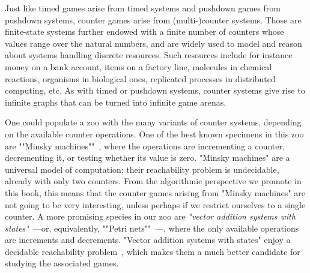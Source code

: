 
%
%

Just like timed games arise from timed systems and pushdown games
from pushdown systems, counter games arise from (multi-)counter
systems.  Those are finite-state systems further endowed with a
finite number of counters whose values range over the natural numbers,
and are widely used to model and reason about systems handling
discrete resources.  Such resources include for instance money on a
bank account, items on a factory line, molecules in chemical
reactions, organisms in biological ones, replicated processes in
distributed computing, etc.  As with timed or pushdown systems,
counter systems give rise to infinite graphs that can be turned into
infinite game arenas.

\AP One could populate a zoo with the many variants of counter systems,
depending on the available counter operations.  One of the best known
specimens in this zoo are ""Minsky machines""~\cite{Minsky:1967},
where the operations are incrementing a counter, decrementing it, or
testing whether its value is zero.  "Minsky machines" are a universal
model of computation; their reachability problem is undecidable,
already with only two counters.  From the algorithmic perspective we
promote in this book, this means that the counter games arising from
"Minsky machines" are not going to be very interesting, unless perhaps
if we restrict ourselves to a single counter.  A more promising
species in our zoo are \emph{"vector addition systems with
  states"}~\cite{Greibach:1978,Hopcroft&Pansiot:1979}---or,
equivalently, ""Petri nets""~\cite{Petri:1962}---, where the only
available operations are increments and decrements.  "Vector addition
systems with states" enjoy a decidable reachability
problem~\cite{Mayr:1981,Kosaraju:1982,Lambert:1992,Leroux:2011}, which
makes them a much better candidate for studying the associated games.

